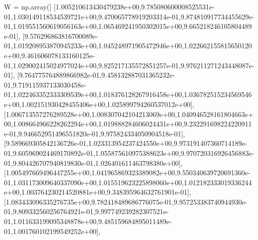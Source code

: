 \documentclass[
  letterpaper,
  DIV=11,
  numbers=noendperiod]{scrartcl}
\newenvironment{Shaded}{\begin{snugshade}}{\end{snugshade}}
\newcommand{\FloatTok}[1]{\textcolor[rgb]{0.68,0.00,0.00}{#1}}
\newcommand{\NormalTok}[1]{\textcolor[rgb]{0.00,0.23,0.31}{#1}}
\newcommand{\OperatorTok}[1]{\textcolor[rgb]{0.37,0.37,0.37}{#1}}
\begin{document}
\begin{Shaded}
\begin{Highlighting}[]
\NormalTok{W }\OperatorTok{=}\NormalTok{ np.array([}
\NormalTok{[}\FloatTok{1.005210613430479238e+00}\NormalTok{,}\FloatTok{9.785080600008525531e{-}01}\NormalTok{,}\FloatTok{1.030149118534539721e+00}\NormalTok{,}\FloatTok{9.470065778919203314e{-}01}\NormalTok{,}\FloatTok{9.874810917734455629e{-}01}\NormalTok{,}\FloatTok{1.019551560619056163e+00}\NormalTok{,}\FloatTok{1.065469241950302015e+00}\NormalTok{,}\FloatTok{9.665218246105804489e{-}01}\NormalTok{],}
\NormalTok{[}\FloatTok{9.576296863816700089e{-}01}\NormalTok{,}\FloatTok{1.019208953870945233e+00}\NormalTok{,}\FloatTok{1.045248971905472946e+00}\NormalTok{,}\FloatTok{1.022662155815650120e+00}\NormalTok{,}\FloatTok{9.461606078133160125e{-}01}\NormalTok{,}\FloatTok{1.029002415024977024e+00}\NormalTok{,}\FloatTok{9.825217135572851257e{-}01}\NormalTok{,}\FloatTok{9.976211271243448087e{-}01}\NormalTok{],}
\NormalTok{[}\FloatTok{9.764775764889866982e{-}01}\NormalTok{,}\FloatTok{9.458132887031365232e{-}01}\NormalTok{,}\FloatTok{9.719115937133030458e{-}01}\NormalTok{,}\FloatTok{1.022463352333309539e+00}\NormalTok{,}\FloatTok{1.018376128267916458e+00}\NormalTok{,}\FloatTok{1.036782515234569546e+00}\NormalTok{,}\FloatTok{1.002151930428455406e+00}\NormalTok{,}\FloatTok{1.025899794260537012e+00}\NormalTok{],}
\NormalTok{[}\FloatTok{1.006713557276289528e+00}\NormalTok{,}\FloatTok{1.008307042104213069e+00}\NormalTok{,}\FloatTok{1.040946528161804663e+00}\NormalTok{,}\FloatTok{1.008664966228262294e+00}\NormalTok{,}\FloatTok{1.019888284606024431e+00}\NormalTok{,}\FloatTok{9.232291698224220911e{-}01}\NormalTok{,}\FloatTok{9.946652951496551820e{-}01}\NormalTok{,}\FloatTok{9.975824334050904518e{-}01}\NormalTok{],}
\NormalTok{[}\FloatTok{9.589669305842136726e{-}01}\NormalTok{,}\FloatTok{1.023313954237424550e+00}\NormalTok{,}\FloatTok{9.973191407360714189e{-}01}\NormalTok{,}\FloatTok{9.605969024469170892e{-}01}\NormalTok{,}\FloatTok{1.055875610975388623e+00}\NormalTok{,}\FloatTok{9.970720316926456883e{-}01}\NormalTok{,}\FloatTok{9.804426707940819830e{-}01}\NormalTok{,}\FloatTok{1.026401611463798380e+00}\NormalTok{],}
\NormalTok{[}\FloatTok{1.005497669496447255e+00}\NormalTok{,}\FloatTok{1.041965869323389082e+00}\NormalTok{,}\FloatTok{9.550340639720691360e{-}01}\NormalTok{,}\FloatTok{1.031173009640337090e+00}\NormalTok{,}\FloatTok{1.015519623225898060e+00}\NormalTok{,}\FloatTok{1.012182333019336244e+00}\NormalTok{,}\FloatTok{1.003764230214520881e+00}\NormalTok{,}\FloatTok{9.348395964632761901e{-}01}\NormalTok{],}
\NormalTok{[}\FloatTok{1.083433096335276735e+00}\NormalTok{,}\FloatTok{9.782418489686776075e{-}01}\NormalTok{,}\FloatTok{9.957253383740944930e{-}01}\NormalTok{,}\FloatTok{9.809332560256764921e{-}01}\NormalTok{,}\FloatTok{9.997749239282307521e{-}01}\NormalTok{,}\FloatTok{1.011633199095348878e+00}\NormalTok{,}\FloatTok{9.485159684895011489e{-}01}\NormalTok{,}\FloatTok{1.001760102199549252e+00}\NormalTok{],}

\end{Highlighting}
\end{Shaded}
\end{document}

